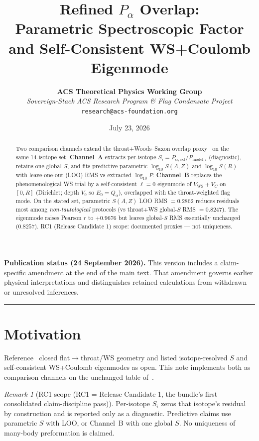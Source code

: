 \documentclass[11pt,a4paper]{article}
\title{\LARGE\bfseries Refined $P_\alpha$ Overlap:\\
Parametric Spectroscopic Factor and Self-Consistent WS+Coulomb Eigenmode}
\author{\textbf{ACS Theoretical Physics Working Group}\\[0.3em]
\small\textit{Sovereign-Stack ACS Research Program \& Flag Condensate Project}\\
\small\texttt{research@acs-foundation.org}}
\date{July 23, 2026}
\theoremstyle{remark}
\newtheorem*{remark}{Remark}
\begin{document}
\maketitle

\begin{abstract}
Two comparison channels extend the throat+Woods--Saxon overlap
proxy~\cite{PalphaThroat2026} on the same 14-isotope set.
\textbf{Channel~A} extracts per-isotope $S_i=P_{\alpha,\mathrm{ext}}/P_{\mathrm{model},i}$
(diagnostic), retains one global $S$, and fits predictive parametric
$\log_{10}S(A,Z)$ and $\log_{10}S(R)$ with leave-one-out (LOO) RMS vs
extracted $\log_{10}P$.
\textbf{Channel~B} replaces the phenomenological WS trial by a
self-consistent $\ell=0$ eigenmode of $V_{\mathrm{WS}}+V_C$ on $[0,R]$
(Dirichlet; depth $V_0$ so $E_0=Q_\alpha$), overlapped with the
throat-weighted flag mode.
On the stated set, parametric $S(A,Z)$ LOO RMS $=0.2862$ reduces
residuals most among \emph{non-tautological} protocols (vs throat+WS
global-$S$ RMS $=0.8247$).  The eigenmode raises Pearson $r$ to
$+0.9676$ but leaves global-$S$ RMS essentially unchanged ($0.8257$).
RC1 (Release Candidate 1) scope: documented proxies --- not uniqueness.
\end{abstract}
\par\smallskip\noindent\textbf{Publication status (24 September 2026).}
This version includes a claim-specific amendment at the end of the main text.
That amendment governs earlier physical interpretations and distinguishes
retained calculations from withdrawn or unresolved inferences.\par\smallskip


\vspace{0.1em}
\hrule
\vspace{0.4em}

\section{Motivation}

Reference~\cite{PalphaThroat2026} closed flat$\to$throat/WS geometry and
listed isotope-resolved $S$ and self-consistent WS+Coulomb eigenmodes as
open.  This note implements both as comparison channels on the unchanged
table of~\cite{NuclearDecay2026}.

\begin{remark}[RC1 scope (RC1 = Release Candidate 1, the bundle's first consolidated claim-discipline pass)]
Per-isotope $S_i$ zeros that isotope's residual by construction and is
reported only as a diagnostic.  Predictive claims use parametric $S$ with
LOO, or Channel~B with one global $S$.  No uniqueness of many-body
preformation is claimed.
\end{remark}
\end{document}
